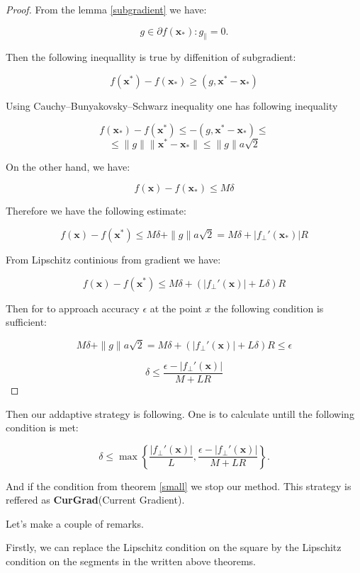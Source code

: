 \documentclass[12pt]{article}
\begin{document}
\begin{proof}

From the lemma \ref{subgradient} we have:

$$g \in \partial f(\textbf{x}_*): g_\parallel = 0.$$

Then the following inequallity is true by diffenition of subgradient:

$$f(\textbf{x}^*) - f(\textbf{x}_*) \geq (g, \textbf{x}^* - \textbf{x}_*)$$

Using  Cauchy–Bunyakovsky–Schwarz inequality one has following inequality

$$f(\textbf{x}_*) - f(\textbf{x}^*) \leq -(g, \textbf{x}^* - \textbf{x}_* )\leq$$
$$\leq \|g\| \|\textbf{x}^* - \textbf{x}_*\|\leq \|g\|a\sqrt{2}$$

On the other hand, we have:

$$f(\textbf{x})-f(\textbf{x}_*)\leq M\delta$$

Therefore we have the following estimate:

$$f(\textbf{x})-f(\textbf{x}^*) \leq M\delta +\|g\|a\sqrt{2} = M\delta + |f_\perp'(\textbf{x}_*)|R$$

From Lipschitz continious from gradient we have:

$$f(\textbf{x})-f(\textbf{x}^*) \leq M\delta + \left(|f_\perp'(\textbf{x})|+L\delta\right)R$$

Then for to approach accuracy $\epsilon$ at the point $x$ the following condition is sufficient:

$$M\delta +\|g\|a\sqrt{2} = M\delta + \left(|f_\perp'(\textbf{x})|+L\delta\right)R \leq \epsilon$$

$$\delta \leq \frac{\epsilon - |f_\perp'(\textbf{x})|}{M+LR}$$
\end{proof}

Then our addaptive strategy is following. One is to calculate untill the following condition is met:

\begin{equation}
\label{Adaptive}
\delta \leq \max\left\{
	\frac{|f_\perp'(\textbf{x})|}{L}, 
	\frac{\epsilon - |f_\perp'(\textbf{x})|}{M+LR}
	\right\}.
\end{equation}

And if the condition from theorem \ref{small} we stop our method. This strategy is reffered as \textbf{CurGrad}(Current Gradient).


Let's make a couple of remarks.

Firstly, we can replace the Lipschitz condition on the square by the Lipschitz condition on the segments in the written above theorems.
\end{document}
